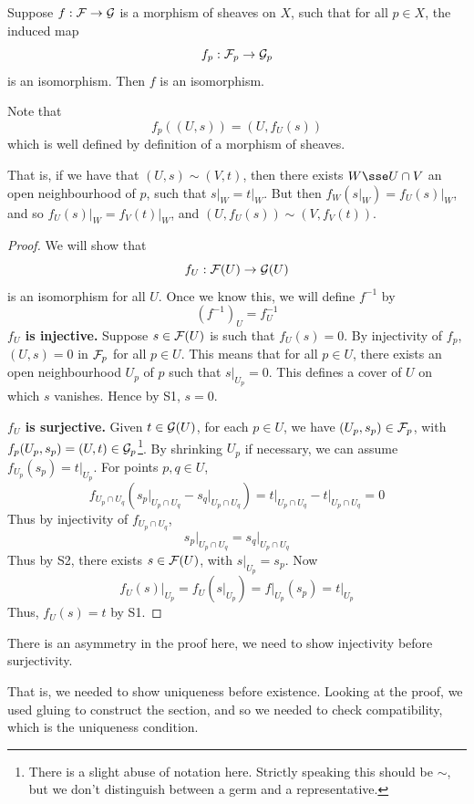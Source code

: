 \documentclass{article}
\begin{document}
\begin{proposition}
    Suppose \(f : \mathcal{F} \to \mathcal{G}\) is a morphism of sheaves on \(X\), such that for all \(p \in X\), the induced map
    \[f_p : \mathcal{F}_p \to \mathcal{G}_p\]
    is an isomorphism. Then \(f\) is an isomorphism.
\end{proposition}

Note that
\[f_p((U, s)) = (U, f_U(s))\]
which is well defined by definition of a morphism of sheaves. \begin{addendum}
    That is, if we have that \((U, s) \sim (V, t)\), then there exists \(W \sse U \cap V\) an open neighbourhood of \(p\), such that \(s\vert_W = t\vert_W\). But then \(f_W(s\vert_W) = f_U(s)\vert_W\), and so \(f_U(s)\vert_W = f_V(t)\vert_W\), and \((U, f_U(s)) \sim (V, f_V(t))\).
\end{addendum}

\begin{proof}
    We will show that
    \[f_U : \mathcal{F}(U) \to \mathcal{G}(U)\]
    is an isomorphism for all \(U\). Once we know this, we will define \(f^{-1}\) by
    \[(f^{-1})_U = f_U^{-1}\]
    \textbf{\(f_U\) is injective.} Suppose \(s \in \mathcal{F}(U)\) is such that \(f_U(s) = 0\). By injectivity of \(f_p\), \((U, s) = 0\) in \(\mathcal{F}_p\) for all \(p \in U\). This means that for all \(p \in U\), there exists an open neighbourhood \(U_p\) of \(p\) such that \(s\vert_{U_p} = 0\). This defines a cover of \(U\) on which \(s\) vanishes. Hence by S1, \(s = 0\). 

    \textbf{\(f_U\) is surjective.} Given \(t \in \mathcal{G}(U)\), for each \(p \in U\), we have \((U_p, s_p) \in \mathcal{F}_p\), with \(f_p(U_p, s_p) = (U, t) \in \mathcal{G}_p\)\footnote{There is a slight abuse of notation here. Strictly speaking this should be \(\sim\), but we don't distinguish between a germ and a representative.}. By shrinking \(U_p\) if necessary, we can assume \(f_{U_p}(s_p) = t\vert_{U_p}\). For points \(p, q \in U\),
    \[f_{U_p \cap U_q}(s_p\vert_{U_p \cap U_q} - s_q\vert_{U_p \cap U_q}) = t\vert_{U_p \cap U_q} - t\vert_{U_p \cap U_q} = 0\]
    Thus by injectivity of \(f_{U_p \cap U_q}\),
    \[s_p\vert_{U_p \cap U_q} = s_q\vert_{U_p \cap U_q}\]
    Thus by S2, there exists \(s \in \mathcal{F}(U)\), with \(s\vert_{U_p} = s_p\). Now
    \[f_U(s) \vert_{U_p} = f_U(s\vert_{U_p}) = f\vert_{U_p}(s_p) = t\vert_{U_p}\]
    Thus, \(f_U(s) = t\) by S1.
\end{proof}

\begin{remark}
    There is an asymmetry in the proof here, we need to show injectivity before surjectivity. \begin{addendum}
        That is, we needed to show uniqueness before existence. Looking at the proof, we used gluing to construct the section, and so we needed to check compatibility, which is the uniqueness condition.
    \end{addendum}
\end{remark}
\end{document}
